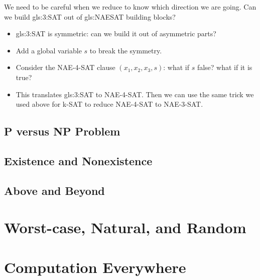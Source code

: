 \documentclass[]{article}
\begin{document}
We need to be careful when we reduce to know which direction we are going.
Can we build \gls{gls:3:SAT} out of \gls{gls:NAESAT} building blocks?
\begin{itemize}
	\item \gls{gls:3:SAT} is symmetric: can we build it out of asymmetric parts?
	\item Add a global variable $s$ to break the symmetry.
	\item Consider the NAE-4-SAT clause $(x_1,x_2,x_3,s)$: what if $s$ false? what if it is true?
	\item This translates  \gls{gls:3:SAT} to NAE-4-SAT. Then we can use the same trick we used above for k-SAT to reduce  NAE-4-SAT to NAE-3-SAT.
\end{itemize}

\subsection{P versus NP Problem}

\subsection{Existence and Nonexistence }

\subsection{Above and Beyond}

\section{Worst-case, Natural, and Random}
\cite[Chapters 5,10]{moore2011nature}
\section{Computation Everywhere}
\cite[Chapter 7]{moore2011nature}


\printglossaries

 


\end{document}
